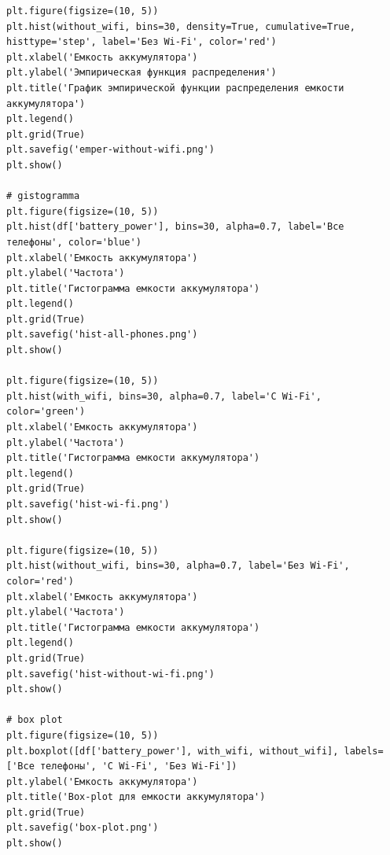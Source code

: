 \documentclass{article}
\begin{document}
\begin{verbatim}
plt.figure(figsize=(10, 5))
plt.hist(without_wifi, bins=30, density=True, cumulative=True, histtype='step', label='Без Wi-Fi', color='red')
plt.xlabel('Емкость аккумулятора')
plt.ylabel('Эмпирическая функция распределения')
plt.title('График эмпирической функции распределения емкости аккумулятора')
plt.legend()
plt.grid(True)
plt.savefig('emper-without-wifi.png')
plt.show()

# gistogramma
plt.figure(figsize=(10, 5))
plt.hist(df['battery_power'], bins=30, alpha=0.7, label='Все телефоны', color='blue')
plt.xlabel('Емкость аккумулятора')
plt.ylabel('Частота')
plt.title('Гистограмма емкости аккумулятора')
plt.legend()
plt.grid(True)
plt.savefig('hist-all-phones.png')
plt.show()

plt.figure(figsize=(10, 5))
plt.hist(with_wifi, bins=30, alpha=0.7, label='С Wi-Fi', color='green')
plt.xlabel('Емкость аккумулятора')
plt.ylabel('Частота')
plt.title('Гистограмма емкости аккумулятора')
plt.legend()
plt.grid(True)
plt.savefig('hist-wi-fi.png')
plt.show()

plt.figure(figsize=(10, 5))
plt.hist(without_wifi, bins=30, alpha=0.7, label='Без Wi-Fi', color='red')
plt.xlabel('Емкость аккумулятора')
plt.ylabel('Частота')
plt.title('Гистограмма емкости аккумулятора')
plt.legend()
plt.grid(True)
plt.savefig('hist-without-wi-fi.png')
plt.show()

# box plot
plt.figure(figsize=(10, 5))
plt.boxplot([df['battery_power'], with_wifi, without_wifi], labels=['Все телефоны', 'С Wi-Fi', 'Без Wi-Fi'])
plt.ylabel('Емкость аккумулятора')
plt.title('Box-plot для емкости аккумулятора')
plt.grid(True)
plt.savefig('box-plot.png')
plt.show()

\end{verbatim}
\end{document}
